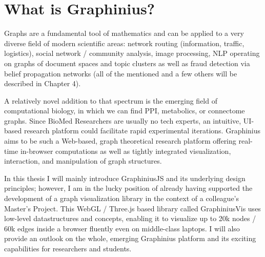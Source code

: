 \section{What is Graphinius?}
\label{sect:intro_whats_graphinius}

Graphs are a fundamental tool of mathematics and can be applied to a very diverse field of modern scientific areas: network routing (information, traffic, logistics), social network / community analysis, image processing, NLP operating on graphs of document spaces and topic clusters as well as fraud detection via belief propagation networks (all of the mentioned and a few others will be described in Chapter 4).

A relatively novel addition to that spectrum is the emerging field of computational biology, in which we can find PPI, metabolics, or connectome graphs. Since BioMed Researchers are usually no tech experts, an intuitive, UI-based research platform could facilitate rapid experimental iterations. Graphinius aims to be such a Web-based, graph theoretical research platform offering real-time in-browser computations as well as tightly integrated visualization, interaction, and manipulation of graph structures. 

In this thesis I will mainly introduce GraphiniusJS and its underlying design principles; however, I am in the lucky position of already having supported the development of a graph visualization library in the context of a colleague's Master's Project. This WebGL / Three.js based library called GraphiniusVis uses low-level datastructures and concepts, enabling it to visualize up to 20k nodes / 60k edges inside a browser fluently even on middle-class laptops. I will also provide an outlook on the whole, emerging Graphinius platform and its exciting capabilities for researchers and students.


